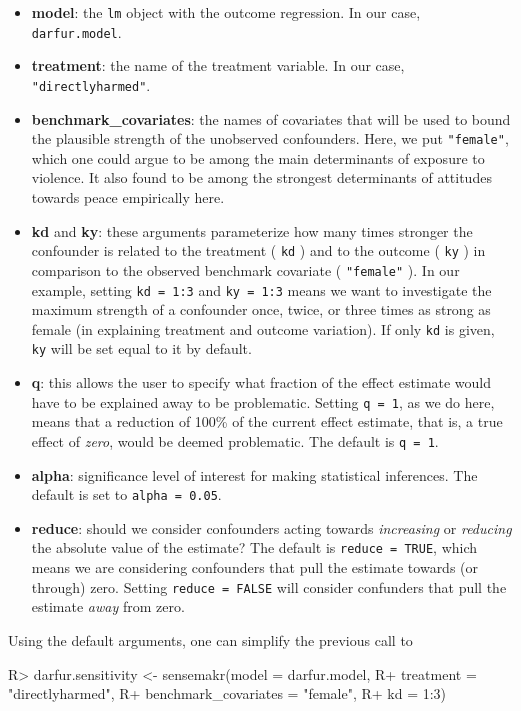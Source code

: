 \documentclass[
]{jss}
\begin{document}
\begin{itemize}
\item
  \textbf{model}: the \texttt{lm} object with the outcome regression. In
  our case, \texttt{darfur.model}.
\item
  \textbf{treatment}: the name of the treatment variable. In our case,
  \texttt{"directlyharmed"}.
\item
  \textbf{benchmark\_covariates}: the names of covariates that will be
  used to bound the plausible strength of the unobserved confounders.
  Here, we put \texttt{"female"}, which one could argue to be among the
  main determinants of exposure to violence. It also found to be among
  the strongest determinants of attitudes towards peace empirically
  here.
\item
  \textbf{kd} and \textbf{ky}: these arguments parameterize how many
  times stronger the confounder is related to the treatment (
  \texttt{kd} ) and to the outcome ( \texttt{ky} ) in comparison to the
  observed benchmark covariate ( \texttt{"female"} ). In our example,
  setting \texttt{kd\ =\ 1:3} and \texttt{ky\ =\ 1:3} means we want to
  investigate the maximum strength of a confounder once, twice, or three
  times as strong as female (in explaining treatment and outcome
  variation). If only \texttt{kd} is given, \texttt{ky} will be set
  equal to it by default.
\item
  \textbf{q}: this allows the user to specify what fraction of the
  effect estimate would have to be explained away to be problematic.
  Setting \texttt{q\ =\ 1}, as we do here, means that a reduction of
  100\% of the current effect estimate, that is, a true effect of
  \emph{zero}, would be deemed problematic. The default is
  \texttt{q\ =\ 1}.
\item
  \textbf{alpha}: significance level of interest for making statistical
  inferences. The default is set to \texttt{alpha\ =\ 0.05}.
\item
  \textbf{reduce}: should we consider confounders acting towards
  \emph{increasing} or \emph{reducing} the absolute value of the
  estimate? The default is \texttt{reduce\ =\ TRUE}, which means we are
  considering confounders that pull the estimate towards (or through)
  zero. Setting \texttt{reduce\ =\ FALSE} will consider confunders that
  pull the estimate \emph{away} from zero.
\end{itemize}

Using the default arguments, one can simplify the previous call to

\begin{CodeChunk}

\begin{CodeInput}
R> darfur.sensitivity <- sensemakr(model = darfur.model, 
R+                                 treatment = "directlyharmed",
R+                                 benchmark_covariates = "female",
R+                                 kd = 1:3)
\end{CodeInput}
\end{CodeChunk}
\end{document}
